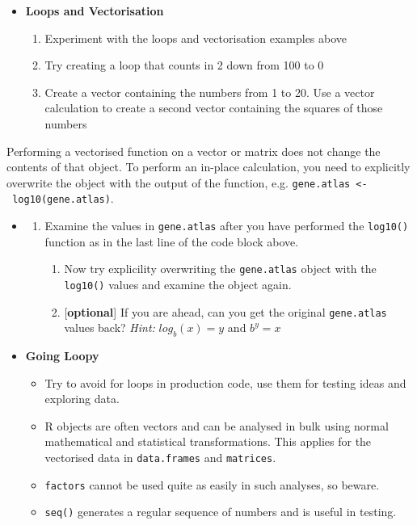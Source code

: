 \documentclass[a4paper]{book}
\providecommand{\tightlist}{%
  \setlength{\itemsep}{0pt}\setlength{\parskip}{0pt}}
\newenvironment{rmdblock}[1]
  {\vspace{1.5em}\begin{shaded*}
  \begin{itemize}
  \renewcommand{\labelitemi}{
    \raisebox{-.7\height}[0pt][0pt]{
      {\setkeys{Gin}{width=3em,keepaspectratio}\texttt{[image: images/\#1]}}
    }
  }
  \item
  }
  {
  \end{itemize}
  \end{shaded*}
  }
\newenvironment{rmdtip}
  {\begin{rmdblock}{tip}}
  {\end{rmdblock}}
\newenvironment{rmdexercise}
  {\begin{rmdblock}{exercise}}
  {\end{rmdblock}}
\begin{document}
\begin{rmdexercise}
\textbf{Loops and Vectorisation}

\begin{enumerate}
\def\labelenumi{\arabic{enumi}.}
\item
  Experiment with the loops and vectorisation examples above
\item
  Try creating a loop that counts in 2 down from 100 to 0
\item
  Create a vector containing the numbers from 1 to 20. Use a vector
  calculation to create a second vector containing the squares of those
  numbers
\end{enumerate}
\end{rmdexercise}

Performing a vectorised function on a vector or matrix does not change
the contents of that object. To perform an in-place calculation, you
need to explicitly overwrite the object with the output of the function,
e.g. \texttt{gene.atlas\ \textless{}-\ log10(gene.atlas)}.

\begin{rmdexercise}
\begin{enumerate}
\def\labelenumi{\arabic{enumi}.}
\setcounter{enumi}{3}
\item
  Examine the values in \texttt{gene.atlas} after you have performed the
  \texttt{log10()} function as in the last line of the code block above.

  \begin{enumerate}
  \def\labelenumii{\alph{enumii})}
  \tightlist
  \item
    Now try explicility overwriting the \texttt{gene.atlas} object with
    the \texttt{log10()} values and examine the object again.
  \item
    {[}\textbf{optional}{]} If you are ahead, can you get the original
    \texttt{gene.atlas} values back? \emph{Hint:} \(log_b(x) = y\) and
    \(b^y = x\)
  \end{enumerate}
\end{enumerate}
\end{rmdexercise}

\begin{rmdtip}
\textbf{Going Loopy}

\begin{itemize}
\tightlist
\item
  Try to avoid for loops in production code, use them for testing ideas
  and exploring data.
\item
  R objects are often vectors and can be analysed in bulk using normal
  mathematical and statistical transformations. This applies for the
  vectorised data in \texttt{data.frames} and \texttt{matrices}.
\item
  \texttt{factors} cannot be used quite as easily in such analyses, so
  beware.
\item
  \texttt{seq()} generates a regular sequence of numbers and is useful
  in testing.
\end{itemize}
\end{rmdtip}
\end{document}
